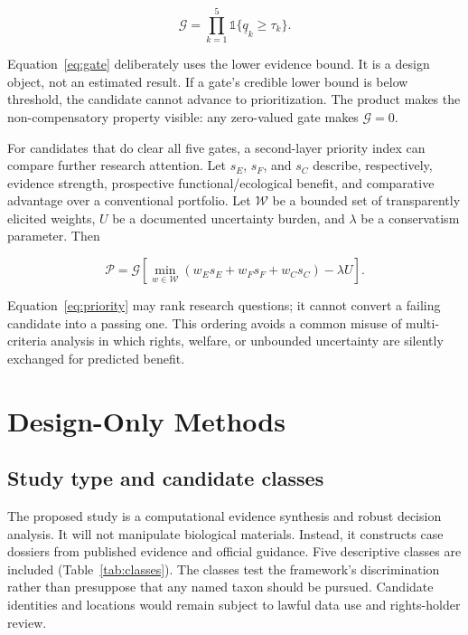 \documentclass[conference]{IEEEtran}
\newcommand{\gate}{\mathcal{G}}
\newcommand{\ind}{\mathbb{1}}
\newcommand{\score}{\mathcal{P}}
\begin{document}
\begin{equation}
\gate = \prod_{k=1}^{5} \ind\{\underline{q}_k \geq \tau_k\}.
\label{eq:gate}
\end{equation}

Equation~\eqref{eq:gate} deliberately uses the lower evidence bound. It is a design object, not an estimated result. If a gate's credible lower bound is below threshold, the candidate cannot advance to prioritization. The product makes the non-compensatory property visible: any zero-valued gate makes $\gate=0$.

For candidates that do clear all five gates, a second-layer priority index can compare further research attention. Let $s_E$, $s_F$, and $s_C$ describe, respectively, evidence strength, prospective functional/ecological benefit, and comparative advantage over a conventional portfolio. Let $\mathcal{W}$ be a bounded set of transparently elicited weights, $U$ be a documented uncertainty burden, and $\lambda$ be a conservatism parameter. Then

\begin{equation}
\score = \gate\left[\min_{w \in \mathcal{W}}\left(w_Es_E+w_Fs_F+w_Cs_C\right)-\lambda U\right].
\label{eq:priority}
\end{equation}

Equation~\eqref{eq:priority} may rank research questions; it cannot convert a failing candidate into a passing one. This ordering avoids a common misuse of multi-criteria analysis in which rights, welfare, or unbounded uncertainty are silently exchanged for predicted benefit.

\section{Design-Only Methods}

\subsection{Study type and candidate classes}

The proposed study is a computational evidence synthesis and robust decision analysis. It will not manipulate biological materials. Instead, it constructs case dossiers from published evidence and official guidance. Five descriptive classes are included (Table~\ref{tab:classes}). The classes test the framework's discrimination rather than presuppose that any named taxon should be pursued. Candidate identities and locations would remain subject to lawful data use and rights-holder review.
\end{document}
